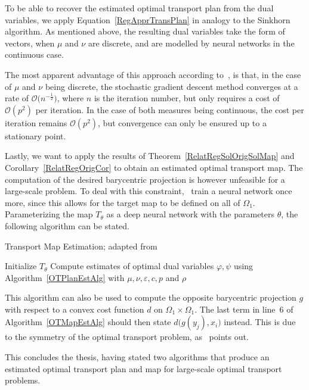 To be able to recover the estimated optimal transport plan from the dual variables, we apply Equation~\ref{RegApprTransPlan} in analogy to the Sinkhorn algorithm. As mentioned above, the resulting dual variables take the form of vectors, when $\mu$ and $\nu$ are discrete, and are modelled by neural networks in the continuous case.

The most apparent advantage of this approach according to\ \cite[Section~3, Convergence rates and computational cost comparison]{Seg2018}, is that, in the case of $\mu$ and $\nu$ being discrete, the stochastic gradient descent method converges at a rate of $\mathcal{O}\big( n^{-\frac{1}{2}} \big)$, where $n$ is the iteration number, but only requires a cost of $\mathcal{O}(p^2)$ per iteration. In the case of both measures being continuous, the cost per iteration remains $\mathcal{O}(p^2)$, but convergence can only be ensured up to a stationary point.

Lastly, we want to apply the results of Theorem~\ref{RelatRegSolOrigSolMap} and Corollary~\ref{RelatRegOrigCor} to obtain an estimated optimal transport map. The computation of the desired barycentric projection is however unfeasible for a large-scale problem. To deal with this constraint,\ \cite{Seg2018} train a neural network once more, since this allows for the target map to be defined on all of $\Omega_1$. Parameterizing the map $T_\theta$ as a deep neural network with the parameters $\theta$, the following algorithm can be stated.

\begin{algorithm}\label{OTMapEstAlg}
	\caption{Transport Map Estimation; adapted from\ {\cite[Algorithm~2]{Seg2018}}}
	Initialize $T_\theta$\;
	Compute estimates of optimal dual variables $\varphi, \psi$ using Algorithm~\ref{OTPlanEstAlg} with $\mu, \nu, \varepsilon, c, p$ and $\rho$\;
\end{algorithm}

This algorithm can also be used to compute the opposite barycentric projection $g$ with respect to a convex cost function $d$ on $\Omega_1 \times \Omega_1$. The last term in line~6 of Algorithm~\ref{OTMapEstAlg} should then state $d\big( g(y_j), x_i \big)$ instead. This is due to the symmetry of the optimal transport problem, as\ \cite{Seg2018} points out.

This concludes the thesis, having stated two algorithms that produce an estimated optimal transport plan and map for large-scale optimal transport problems.